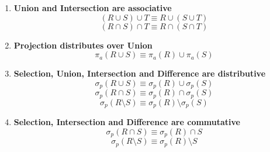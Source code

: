 \documentclass[a4paper]{article}
\begin{document}
\begin{twocolumn}
\begin{enumerate}
	\item \textbf{Union and Intersection are associative}
	\[ (R \cup S) \cup T \equiv R \cup (S \cup T) \]
	\[ (R \cap S) \cap T \equiv R \cap (S \cap T) \]
	
	\item \textbf{Projection distributes over Union}
	\[ \pi_{a}(R \cup S) \equiv \pi_{a}(R) \cup \pi_{a}(S) \] 
	
	\item \textbf{Selection, Union, Intersection and Difference are distributive}
	\[ \sigma_{p}(R \cup S) \equiv \sigma_{p}(R) \cup \sigma_{p}(S) \] 
	\[ \sigma_{p}(R \cap S) \equiv \sigma_{p}(R) \cap \sigma_{p}(S) \] 
	\[ \sigma_{p}(R \setminus S) \equiv \sigma_{p}(R) \setminus \sigma_{p}(S) \] 
	
	\item \textbf{Selection, Intersection and Difference are commutative}
	\[ \sigma_{p}(R \cap S) \equiv \sigma_p(R) \cap S \] 
	\[ \sigma_{p}(R \setminus S) \equiv \sigma_p(R) \setminus S \] 
\end{enumerate}



\end{twocolumn}
\end{document}
